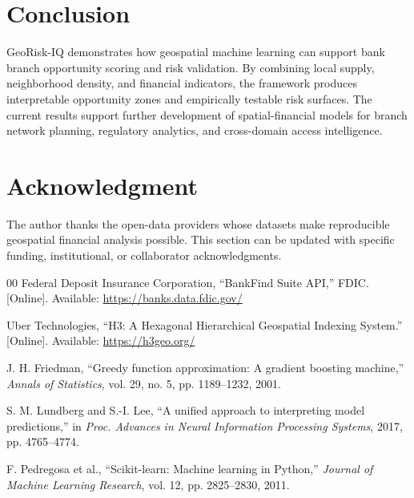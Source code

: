 \documentclass[conference]{IEEEtran}
\begin{document}
\section{Conclusion}
GeoRisk-IQ demonstrates how geospatial machine learning can support bank
branch opportunity scoring and risk validation. By combining local supply,
neighborhood density, and financial indicators, the framework produces
interpretable opportunity zones and empirically testable risk surfaces. The
current results support further development of spatial-financial models for
branch network planning, regulatory analytics, and cross-domain access
intelligence.

\section*{Acknowledgment}
The author thanks the open-data providers whose datasets make reproducible
geospatial financial analysis possible. This section can be updated with
specific funding, institutional, or collaborator acknowledgments.

\begin{thebibliography}{00}
Federal Deposit Insurance Corporation, ``BankFind Suite API,'' FDIC.
[Online]. Available: \url{https://banks.data.fdic.gov/}

Uber Technologies, ``H3: A Hexagonal Hierarchical Geospatial Indexing
System.'' [Online]. Available: \url{https://h3geo.org/}

J. H. Friedman, ``Greedy function approximation: A gradient boosting
machine,'' \textit{Annals of Statistics}, vol. 29, no. 5, pp. 1189--1232,
2001.

S. M. Lundberg and S.-I. Lee, ``A unified approach to interpreting model
predictions,'' in \textit{Proc. Advances in Neural Information Processing
Systems}, 2017, pp. 4765--4774.

F. Pedregosa et al., ``Scikit-learn: Machine learning in Python,''
\textit{Journal of Machine Learning Research}, vol. 12, pp. 2825--2830,
2011.
\end{thebibliography}
\end{document}
